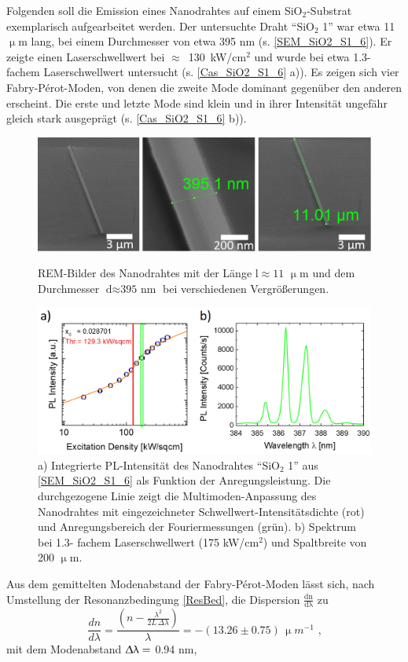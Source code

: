 Folgenden soll die Emission eines Nanodrahtes auf einem SiO$_\text{2}$-Substrat
exemplarisch aufgearbeitet werden. Der untersuchte Draht ``SiO$_\text{2}$ 1''
war etwa 11 $\upmu$m lang, bei einem Durchmesser von etwa 395 nm (s.
\autoref{SEM_SiO2_S1_6}). Er zeigte einen Laserschwellwert bei \mbox{$\approx$
130 kW/cm$^\text{2}$} und wurde bei etwa 1.3-fachem Laserschwellwert untersucht
(s. \autoref{Cas_SiO2_S1_6} a)). Es zeigen sich vier Fabry-Pérot-Moden, von
denen die zweite Mode dominant gegenüber den anderen erscheint. Die erste und
letzte Mode sind klein und in ihrer Intensität ungefähr gleich stark ausgeprägt
(s. \autoref{Cas_SiO2_S1_6} b)).\begin{figure}[h] \centering
\includegraphics[width=.6\textwidth]{Bilder/SiO2/SEM_SiO2_S1_6}
\caption{REM-Bilder des Nanodrahtes mit der Länge \mbox{$\text{l} \approx
\text{11 }\upmu\text{m}$} und dem Durchmesser \mbox{$\text{d} \approx \text{395
nm}$} bei verschiedenen Vergrößerungen.} \label{SEM_SiO2_S1_6}
\includegraphics[width=.6\textwidth]{Bilder/SiO2/Cas_SiO2_S1_6} \caption{a)
Integrierte PL-Intensität des Nanodrahtes ``SiO$_\text{2}$ 1'' aus
\autoref{SEM_SiO2_S1_6} als Funktion der Anregungsleistung. Die durchgezogene
Linie zeigt die Multimoden-Anpassung des Nanodrahtes mit eingezeichneter
Schwellwert-Intensitätsdichte (rot) und Anregungsbereich der Fouriermessungen
(grün). b) Spektrum bei 1.3- fachem Laserschwellwert (175 kW/cm$^\text{2}$) und
Spaltbreite von 200 $\upmu$m.} \label{Cas_SiO2_S1_6} \end{figure}Aus dem
gemittelten Modenabstand der Fabry-Pérot-Moden lässt sich, nach Umstellung der
Resonanzbedingung \autoref{ResBed}, die Dispersion
$\frac{\text{dn}}{\text{d}\uplambda}$ zu \begin{equation}
\frac{dn}{d\lambda}=\frac{\left(n -\frac{\lambda^2}{2L\,
\Delta\lambda}\right)}{\lambda} = -(13.26 \pm 0.75)\, \upmu m^{-1} \text{ ,}
\label{Disp} \end{equation} mit dem Modenabstand $\Updelta\uplambda=$ 0.94 nm,
